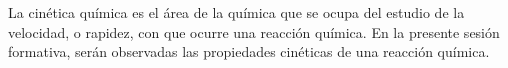 \documentclass[../main]{subfiles}
\begin{document}
La cinética química es el área de la química que se ocupa del estudio de la velocidad, o rapidez, con que ocurre una reacción química. \parencite{book:chang2013}
En la presente sesión formativa, serán observadas las propiedades cinéticas de una reacción química.
\end{document}
